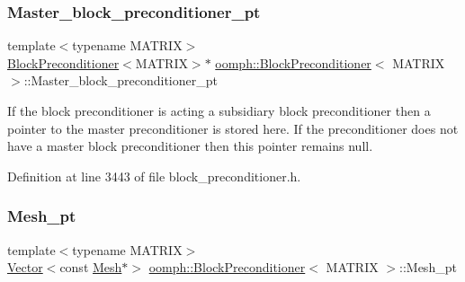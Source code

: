 \mbox{\label{classoomph_1_1BlockPreconditioner_a7759d79eefa52fb688caac08a4ff4894}} 
\subsubsection{\texorpdfstring{Master\+\_\+block\+\_\+preconditioner\+\_\+pt}{Master\_block\_preconditioner\_pt}}
{\footnotesize\ttfamily template$<$typename M\+A\+T\+R\+IX$>$ \\
\hyperlink{classoomph_1_1BlockPreconditioner}{Block\+Preconditioner}$<$M\+A\+T\+R\+IX$>$$\ast$ \hyperlink{classoomph_1_1BlockPreconditioner}{oomph\+::\+Block\+Preconditioner}$<$ M\+A\+T\+R\+IX $>$\+::Master\+\_\+block\+\_\+preconditioner\+\_\+pt\hspace{0.3cm}{\ttfamily [private]}}



If the block preconditioner is acting a subsidiary block preconditioner then a pointer to the master preconditioner is stored here. If the preconditioner does not have a master block preconditioner then this pointer remains null. 



Definition at line 3443 of file block\+\_\+preconditioner.\+h.

\mbox{\label{classoomph_1_1BlockPreconditioner_a89adb506e8f9103c80b4b36cc309f536}} 
\subsubsection{\texorpdfstring{Mesh\+\_\+pt}{Mesh\_pt}}
{\footnotesize\ttfamily template$<$typename M\+A\+T\+R\+IX$>$ \\
\hyperlink{classoomph_1_1Vector}{Vector}$<$const \hyperlink{classoomph_1_1Mesh}{Mesh}$\ast$$>$ \hyperlink{classoomph_1_1BlockPreconditioner}{oomph\+::\+Block\+Preconditioner}$<$ M\+A\+T\+R\+IX $>$\+::Mesh\+\_\+pt\hspace{0.3cm}{\ttfamily [protected]}}



